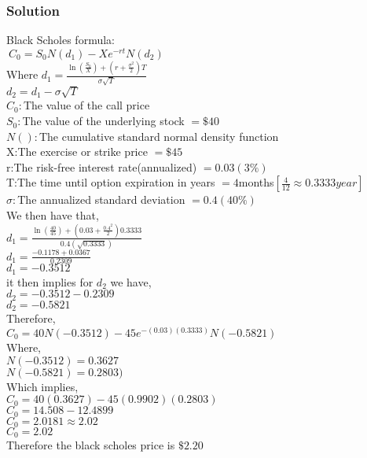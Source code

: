 \documentclass{article}
\begin{document}
\subsubsection{Solution}
Black Scholes formula$:$ \\
$\ \displaystyle C_{0}= S_{0}N(d_{1})-Xe^{-rt}N(d_{2}) $ \\
Where $ \displaystyle d_{1}=\frac{\ln(\frac{S_{0}}{X})+(r+\frac{\sigma^{2}}{2})T}{\sigma \sqrt{T}} $ \\
$ \displaystyle d_{2}=d_{1}- \sigma \sqrt{T} $\\
$C_{0}:$The value of the call price\\
$S_{0}:$The value of the underlying stock $=\$40$ \\
$N( ):$The cumulative standard normal density function \\
X:The exercise or strike price $=\$45$ \\
r:The risk-free interest rate(annualized) $=0.03(3\%)$  \\
T:The time until option expiration in years $=4$months$[\frac{4}{12}\approx 0.3333year]$\\
$\sigma:$The annualized standard deviation $=0.4(40\%)$\\
We then have that,\\
$ \displaystyle d_{1}=\frac{\ln(\frac{40}{45})+(0.03+\frac{0.4^{2}}{2})0.3333}{0.4 (\sqrt{0.3333})} $ \\
$ \displaystyle d_{1}=\frac{-0.1178+0.0367}{0.2309} $\\
$ \displaystyle d_{1}= -0.3512 $ \\
it then implies for $d_{2}$ we have,\\
$ \displaystyle d_{2}= -0.3512-0.2309 $ \\
$ \displaystyle d_{2}= -0.5821 $ \\
Therefore,\\
$ \displaystyle C_{0}= 40N(-0.3512)-45e^{-(0.03)(0.3333)}N(-0.5821) $ \\
Where,\\
$N(-0.3512)=0.3627$ \\
$N(-0.5821)=0.2803)$ \\
Which implies,\\
$ \displaystyle C_{0}= 40(0.3627)-45(0.9902)(0.2803) $ \\
$ \displaystyle C_{0}= 14.508-12.4899 $ \\
$ \displaystyle C_{0}= 2.0181\approx 2.02 $ \\
$ \displaystyle C_{0}=2.02 $ \\
Therefore the black scholes price is $\$2.20$ \\
\end{document}

